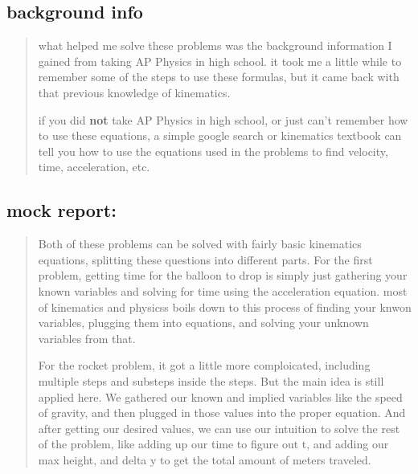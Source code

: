 \documentclass[12pt]{article}
\begin{document}
\subsection*{background info}

\begin{quote}
what helped me solve these problems was the background information I gained from taking AP Physics in
high school. it took me a little while to remember some of the steps to use these formulas, but it
came back with that previous knowledge of kinematics.

\medskip

if you did \textbf{not} take AP Physics in high school, or just can't remember how to use these
equations, a simple google search or kinematics textbook can tell you how to use the equations
used in the problems to find velocity, time, acceleration, etc.
\end{quote}


\subsection*{mock report:}


\begin{quote}
Both of these problems can be solved with fairly basic kinematics equations, splitting these
questions into different parts. For the first problem, getting time for the balloon to drop is
simply just gathering your known variables and solving for time using the acceleration equation.
most of kinematics and physicss boils down to this process of finding your knwon variables, plugging
them into equations, and solving your unknown variables from that.

For the rocket problem, it got a little more comploicated, including multiple steps and substeps
inside the steps. But the main idea is still applied here. We gathered our known and implied variables
like the speed of gravity, and then plugged in those values into the proper equation. And after
getting our desired values, we can use our intuition to solve the rest of the problem, like adding
up our time to figure out t, and adding our max height, and delta y to get the total amount of
meters traveled.


\end{quote}
\end{document}
